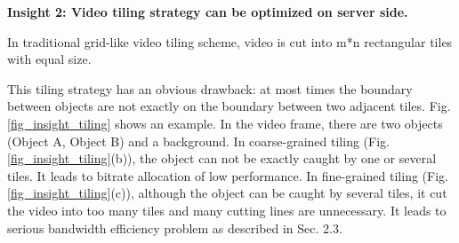 \textbf{Insight 2: Video tiling strategy can be optimized on server side.}

In traditional grid-like video tiling scheme, video is cut into m*n rectangular tiles with equal size. 

This tiling strategy has an obvious drawback: at most times the boundary between objects are not exactly on the boundary between two adjacent tiles. Fig. \ref{fig_insight_tiling} shows an example. In the video frame, there are two objects (Object A, Object B) and a background. In coarse-grained tiling (Fig. \ref{fig_insight_tiling}(b)), the object can not be exactly caught by one or several tiles. It leads to bitrate allocation of low performance. In fine-grained tiling (Fig. \ref{fig_insight_tiling}(c)), although the object can be caught by several tiles, it cut the video into too many tiles and many cutting lines are unnecessary. It leads to serious bandwidth efficiency problem as described in Sec. 2.3.

